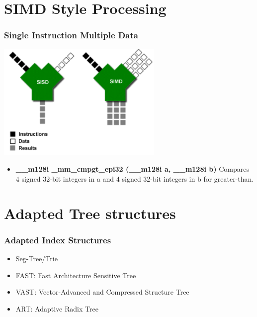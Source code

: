 \documentclass{beamer}
\begin{document}
\section{SIMD Style Processing}
\begin{frame}
\frametitle{Single Instruction Multiple Data}
\begin{center}
	\includegraphics[width=0.6\textwidth]{img/simd.png}
\end{center}
\begin{itemize}
	\item \textbf{\_\_m128i \_mm\_cmpgt\_epi32 (\_\_m128i a, \_\_m128i b)} Compares 4 signed 32-bit integers in a and 4 signed 32-bit integers
	in b for greater-than.
\end{itemize}
\end{frame}
\section{Adapted Tree structures}

\begin{frame}
\frametitle{Adapted Index Structures}
\begin{itemize}
	\item Seg-Tree/Trie
	\item FAST: Fast Architecture Sensitive Tree
	\item VAST: Vector-Advanced and Compressed Structure Tree
	\item ART: Adaptive Radix Tree
\end{itemize}
\end{frame}
\end{document}
